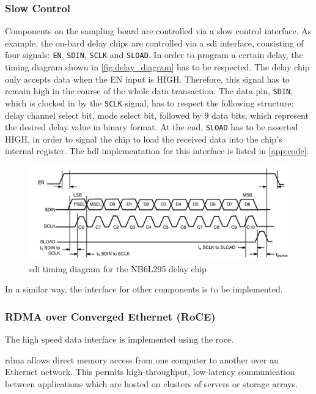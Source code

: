 \subsubsection*{Slow Control}
Components on the sampling board are controlled via a slow control interface. 
As example, the on-bard delay chips are controlled via a \gls{sdi} interface, consisting of four signals: \texttt{EN}, \texttt{SDIN}, \texttt{SCLK} and \texttt{SLOAD}. 
In order to program a certain delay, the timing diagram shown in \autoref{fig:delay_diagram} has to be respected.
The delay chip only accepts data when the EN input is HIGH. 
Therefore, this signal has to remain high in the course of the whole data transaction. 
The data pin, \texttt{SDIN}, which is clocked in by the \texttt{SCLK} signal, has to respect the following structure: delay channel select bit, mode select bit, followed by 9 data bits, which represent the desired delay value in binary format.
At the end, \texttt{SLOAD} has to be asserted HIGH, in order to signal the chip to load the received data into the chip's internal register.
The \gls{hdl} implementation for this interface is listed in \autoref{app:code}. 

\begin{figure}[tb]
	\centering
	\includegraphics[width = \textwidth]{chap/05-readout/img/sdi_interface_delay}
	\caption{\gls{sdi} timing diagram for the NB6L295 delay chip \cite{NB6L295}}
	\label{fig:delay_diagram}
\end{figure}

In a similar way, the interface for other components is to be implemented.

\subsubsection*{RDMA over Converged Ethernet (RoCE)}
The high speed data interface is implemented using the \gls{roce}.

\Gls{rdma} allows direct memory access from one computer to another over an Ethernet network. This permits high-throughput, low-latency communication between applications which are hosted on clusters of servers or storage arrays. 


